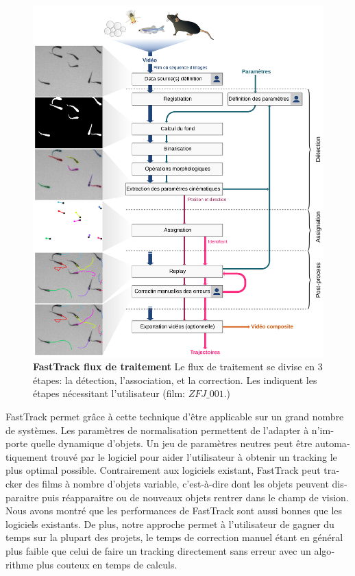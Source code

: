\begin{otherlanguage}{french}
    \begin{figure}[h!]
      \centering
      \includegraphics[width=1\textwidth]{part_1/assets/Figure_1_fr.png}
        \caption{{\bf FastTrack flux de traitement} Le flux de traitement se divise en 3 étapes: la détection, l'association, et la correction. Les \faUser indiquent les étapes nécessitant l'utilisateur (film: $ZFJ\_001$.)}
      \label{}
    \end{figure}

FastTrack permet grâce à cette technique d'être applicable sur un grand nombre de systèmes. Les paramètres de normalisation permettent de l'adapter à n'importe quelle dynamique d'objets. Un jeu de paramètres neutres peut être automatiquement trouvé par le logiciel pour aider l'utilisateur à obtenir un tracking le plus optimal possible. Contrairement aux logiciels existant, FastTrack peut tracker des films à nombre d'objets variable, c’est-à-dire dont les objets peuvent disparaitre puis réapparaitre ou de nouveaux objets rentrer dans le champ de vision. Nous avons montré que les performances de FastTrack sont aussi bonnes que les logiciels existants. De plus, notre approche permet à l'utilisateur de gagner du temps sur la plupart des projets, le temps de correction manuel étant en général plus faible que celui de faire un tracking directement sans erreur avec un algorithme plus couteux en temps de calculs.


\end{otherlanguage}
